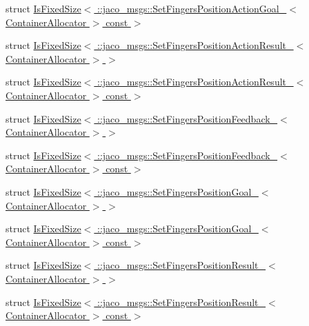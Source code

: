 \begin{DoxyCompactItemize}
\item 
struct \hyperlink{structros_1_1message__traits_1_1IsFixedSize_3_01_1_1jaco__msgs_1_1SetFingersPositionActionGoal__02311e94e56968a1e560af28cdcc9fa1}{Is\+Fixed\+Size$<$ \+::jaco\+\_\+msgs\+::\+Set\+Fingers\+Position\+Action\+Goal\+\_\+$<$ Container\+Allocator $>$ const  $>$}
\item 
struct \hyperlink{structros_1_1message__traits_1_1IsFixedSize_3_01_1_1jaco__msgs_1_1SetFingersPositionActionResult5da3521b7abec5178a9c3038c11f63d8}{Is\+Fixed\+Size$<$ \+::jaco\+\_\+msgs\+::\+Set\+Fingers\+Position\+Action\+Result\+\_\+$<$ Container\+Allocator $>$ $>$}
\item 
struct \hyperlink{structros_1_1message__traits_1_1IsFixedSize_3_01_1_1jaco__msgs_1_1SetFingersPositionActionResult5c72c2a1694af4cc7dc8586930e94a67}{Is\+Fixed\+Size$<$ \+::jaco\+\_\+msgs\+::\+Set\+Fingers\+Position\+Action\+Result\+\_\+$<$ Container\+Allocator $>$ const  $>$}
\item 
struct \hyperlink{structros_1_1message__traits_1_1IsFixedSize_3_01_1_1jaco__msgs_1_1SetFingersPositionFeedback___3_01ContainerAllocator_01_4_01_4}{Is\+Fixed\+Size$<$ \+::jaco\+\_\+msgs\+::\+Set\+Fingers\+Position\+Feedback\+\_\+$<$ Container\+Allocator $>$ $>$}
\item 
struct \hyperlink{structros_1_1message__traits_1_1IsFixedSize_3_01_1_1jaco__msgs_1_1SetFingersPositionFeedback___33ff6c5dd5ef4de32be16b60fa4579bcc}{Is\+Fixed\+Size$<$ \+::jaco\+\_\+msgs\+::\+Set\+Fingers\+Position\+Feedback\+\_\+$<$ Container\+Allocator $>$ const  $>$}
\item 
struct \hyperlink{structros_1_1message__traits_1_1IsFixedSize_3_01_1_1jaco__msgs_1_1SetFingersPositionGoal___3_01ContainerAllocator_01_4_01_4}{Is\+Fixed\+Size$<$ \+::jaco\+\_\+msgs\+::\+Set\+Fingers\+Position\+Goal\+\_\+$<$ Container\+Allocator $>$ $>$}
\item 
struct \hyperlink{structros_1_1message__traits_1_1IsFixedSize_3_01_1_1jaco__msgs_1_1SetFingersPositionGoal___3_01Cf2cf2472bfaefa20713862ca5385107a}{Is\+Fixed\+Size$<$ \+::jaco\+\_\+msgs\+::\+Set\+Fingers\+Position\+Goal\+\_\+$<$ Container\+Allocator $>$ const  $>$}
\item 
struct \hyperlink{structros_1_1message__traits_1_1IsFixedSize_3_01_1_1jaco__msgs_1_1SetFingersPositionResult___3_01ContainerAllocator_01_4_01_4}{Is\+Fixed\+Size$<$ \+::jaco\+\_\+msgs\+::\+Set\+Fingers\+Position\+Result\+\_\+$<$ Container\+Allocator $>$ $>$}
\item 
struct \hyperlink{structros_1_1message__traits_1_1IsFixedSize_3_01_1_1jaco__msgs_1_1SetFingersPositionResult___3_0fb54ed619e822fe12cc5bea66a067dee}{Is\+Fixed\+Size$<$ \+::jaco\+\_\+msgs\+::\+Set\+Fingers\+Position\+Result\+\_\+$<$ Container\+Allocator $>$ const  $>$}

\end{DoxyCompactItemize}
